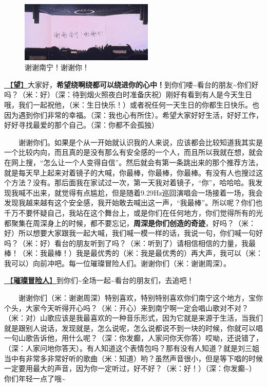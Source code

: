 \documentclass[]{ctexbook}
\begin{document}
\begin{figure}

{\centering \includegraphics[width=180pt]{img/nanning20241206/thank-nanning} 

}

\caption{谢谢南宁！谢谢你！}\label{fig:unnamed-chunk-140}
\end{figure}

\hyperref[hope]{🎵【\textbf{望}】}大家好，\textbf{希望绕啊绕都可以绕进你的心中！}到你们喽\textasciitilde 看台的朋友\textasciitilde 你们好吗？（米：好）（深：待到烟火照夜白时准备庆祝）刚好有看到有人是今天生日哦，我们一起祝他，（米：生日快乐！）或者祝任何一天生日的你都生日快乐。也因为遇到你们非常的幸福。（深：我也心有所住）。希望大家好好生活，好好工作，好好寻找最爱的那个自己。（深：你都不会孤独）

  谢谢你们。如果是个从一开始就认识我的人来说，应该都会比较知道我其实是一个比较内向，而且真的是没有那么有安全感的一个人，而且所以我就在想，就会在网上搜，``怎么让一个人变得自信''。然后就会有第一条跳出来的那个推荐方法，就是每天早上起来对着镜子的大喊，你最棒，你最棒，你最棒。有没有人也搜过这个方法？没有。那后面我在家试过一次，第一天我对着镜子，``你''，哈哈哈。我发现我喊不出来，就觉得有点尴尬，但是随着9.29Hz巡回演唱会一场接着一场，我会发现我越来越有这个安全感，我开始敢去喊出这一声，``我最棒''。所以呢？你们也千万不要怀疑自己，我站在这个舞台上，或是你们在任何地方，你们觉得所有的光都聚集在周深身上的时候，都不要忘记，\textbf{周深是你们创造的奇迹}，好吗？（米：好）所以想要大家跟我一起大喊，我们喊一模一样的话，我说一句，你们喊一句好吗？（米：好）看台的朋友听到了吗？（米：听到了）请相信相信的力量，我最棒！（米：我最棒！）我是最优秀的（米：我是最优秀的）再大声，我可以（米：我可以）向前冲吧。每一位璀璨冒险人们。谢谢你们（米：谢谢周深）。

\hyperref[adventurers]{🎵【\textbf{璀璨冒险人}】}到你们\textasciitilde 全场一起\textasciitilde 看台的朋友们，去追吧！

  谢谢你们（米：谢谢周深）特别喜欢，特别特别喜欢你们南宁这个地方，宝你个头，大家今天听得开心吗？（米：开心）来到南宁啊一定会唱山歌对不对？（米：对）山歌应该是我最喜欢的一种音乐形式，因为它就是来源于生活，当我们就是跟别人说话，发现就是，怎么说呢，怎么说都说不到一块的时候，你就可以唱一句山歌告诉他，用什么呢？（深：你发癫，人家问你天你答）哎呦，还说错了，（深：人家问地你答天）。有人知道这个表情包吗？那有没有人知道？就是刘三姐当中有非常多非常好听的歌曲（米：知道）哟？虽然声音很小，但是等下唱的时候一定要用最大的声音，因为你一定听过，好不好？（米：好！）（深：你发癫\textasciitilde）你们年轻一点了哦\textasciitilde{}
\end{document}
